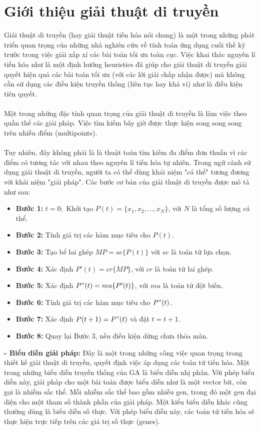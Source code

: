 \documentclass[a4paper,12pt]{article}
\begin{document}
\section{Giới thiệu giải thuật di truyền}
Giải thuật di truyền (hay giải thuật tiến hóa nói chung) là một trong những phát triển quan trọng của những nhà nghiên cứu về tính toán ứng dụng cuối thế kỷ trước trong việc giải xấp xỉ các bài toán tối ưu toàn cục. Việc khai thác nguyên lí tiến hóa như là một định hướng heuristics đã giúp cho giải thuật di truyền giải quyết hiệu quả các bài toán tối ưu (với các lời giải chấp nhận được) mà không cần sử dụng các điều kiện truyền thống (liên tục hay khả vi) như là điều kiện tiên quyết.\\\\
Một trong những đặc tính quan trọng của giải thuật di truyền là làm việc theo quần thể các giải pháp. Việc tìm kiếm bây giờ được thực hiện song song song trên nhiều điểm (multipoints).\\\\
Tuy nhiên, đây không phải là là thuật toán tìm kiếm đa điểm đơn thuần vì các điểm có tương tác với nhau theo nguyên lí tiến hóa tự nhiên. Trong ngữ cảnh sử dụng giải thuật di truyền, người ta có thể dùng khái niệm "cá thể" tương đương với khái niệm "giải pháp". Các bước cơ bản của giải thuật di truyền được mô tả như sau:
\begin{itemize}
\item
\textbf{Bước 1:} $t=0;$ Khởi tạo $P(t) = \{x_1,x_2,\ldots,x_N\}$, với $N$ là tổng số lượng cá thể.
\item
\textbf{Bước 2:} Tính giá trị các hàm mục tiêu cho $P(t)$.
\item
\textbf{Bước 3:} Tạo bể lai ghép $MP = se\{P(t)\}$ với $se$ là toán tử lựa chọn.
\item
\textbf{Bước 4:} Xác định $P'(t) = cr\{MP\}$, với $cr$ là toán tử lai ghép.
\item
\textbf{Bước 5:} Xác định $P"(t) = mu\{P'(t)\}$, với $mu$ là toán tử đột biến.
\item
\textbf{Bước 6:} Tính giá trị các hàm mục tiêu cho $P"(t)$.
\item
\textbf{Bước 7:} Xác định $P(t+1) = P"(t)$ và đặt $t = t+1$.
\item
\textbf{Bước 8:} Quay lại Bước 3, nếu điều kiện dừng chưa thỏa mãn.
\end{itemize}
\textbf{- Biểu diễn giải pháp:} Đây là một trong những công việc quan trọng trong thiết kế giải thuật di truyền, quyết định việc áp dụng các toán tử tiến hóa. Một trong những biểu diễn truyền thống của GA là biểu diễn nhị phân. Với phép biểu diễn này, giải pháp cho một bài toán được biểu diễn như là một vector bit, còn gọi là nhiễm sắc thể. Mỗi nhiễm sắc thể bao gồm nhiều gen, trong đó một gen đại diện cho một tham số thành phần của giải pháp. Một kiểu biểu diễn khác cũng thường dùng là biểu diễn số thực. Với phép biểu diễn này, các toán tử tiến hóa sẽ thực hiện trực tiếp trên các giá trị số thực (genes).\\
\end{document}
